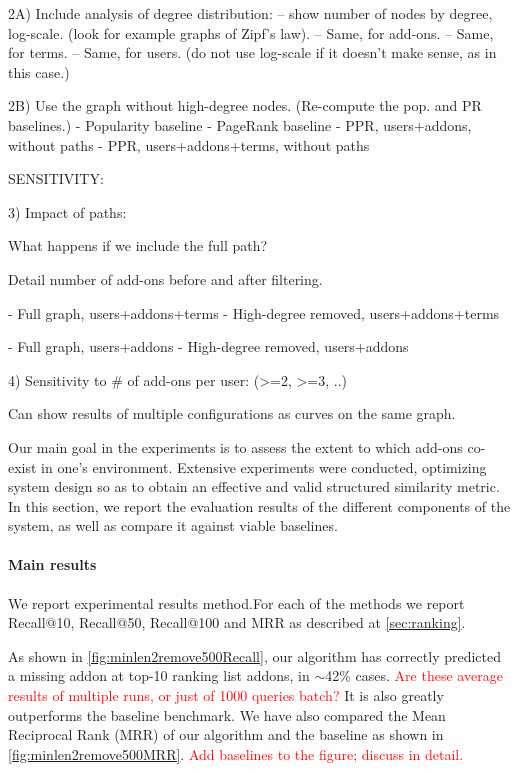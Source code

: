\documentclass[11pt,oneside]{book}
\begin{document}
2A) Include analysis of degree distribution: 
-- show number of nodes by degree, log-scale. (look for example graphs of Zipf's law).
-- Same, for add-ons.
-- Same, for terms.
-- Same, for users. (do not use log-scale if it doesn't make sense, as in this case.)

2B) Use the graph without high-degree nodes. (Re-compute the pop. and PR baselines.)
- Popularity baseline
- PageRank baseline
- PPR, users+addons, without paths
- PPR, users+addons+terms, without paths

SENSITIVITY:

3) Impact of paths:

What happens if we include the full path?

Detail number of add-ons before and after filtering. 

- Full graph, users+addons+terms
- High-degree removed, users+addons+terms

- Full graph, users+addons
- High-degree removed, users+addons

4) Sensitivity to # of add-ons per user: (>=2, >=3, ..)

Can show results of multiple configurations as curves on the same graph.
\fi

Our main goal in the experiments is to assess the extent to which add-ons co-exist in one's environment. Extensive experiments were conducted, optimizing system design so as to obtain an effective and valid structured similarity metric. In this section, we report the evaluation results of the different components of the system, as well as compare it against viable baselines.  

\paragraph{Main results}

We report experimental results method.For each of the methods we report Recall@10, Recall@50,
Recall@100 and MRR as described at \autoref{sec:ranking}. 


As shown in \autoref{fig:minlen2remove500Recall}, our algorithm has correctly
predicted a missing addon at top-10 ranking list addons, in
{$\sim$}42\% cases. \textcolor{red}{Are these average results of multiple runs, or just of 1000 queries batch?} It is also greatly outperforms the baseline
benchmark. We have also compared the Mean Reciprocal Rank (MRR) of our
algorithm and the baseline as shown in
\autoref{fig:minlen2remove500MRR}. \textcolor{red}{Add baselines to the figure; discuss in detail.}
\end{document}
